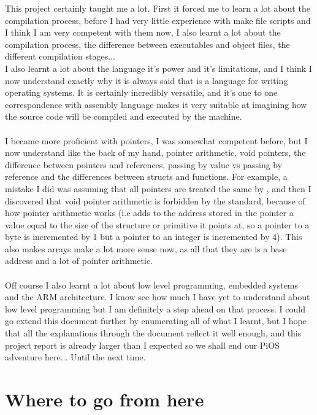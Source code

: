 \documentclass[12pt, svgnames]{book}
\begin{document}
This project certainly taught me a lot. First it forced me to learn a lot about the compilation process, before I had very little experience with make file scripts and I think I am very competent with them now, I also learnt a lot about the compilation process, the difference between executables and object files, the different compilation stages...
\\
I also learnt a lot about the  language it's power and it's limitations, and I think I now understand exactly why it is always said that  is a language for writing operating systems. It is certainly incredibly versatile, and it's one to one correspondence with assembly language makes it very suitable at imagining how the source code will be compiled and executed by the machine. 
\\~\\
I became more proficient with pointers, I was somewhat competent before, but I now understand like the back of my hand, pointer arithmetic, void pointers, the difference between pointers and references, passing by value vs passing by reference and the differences between structs and functions. For example, a mistake I did was assuming that all pointers are treated the same by , and then I discovered that void pointer arithmetic is forbidden by the  standard, because of how pointer arithmetic works (i.e  adds to the address stored in the pointer a value equal to the size of the structure or primitive it points at, so a pointer to a byte is incremented by 1 but a pointer to an integer is incremented by 4). This also makes arrays make a lot more sense now, as all that they are is a base address and a lot of pointer arithmetic.
\\~\\
Off course I also learnt a lot about low level programming, embedded systems and the ARM architecture. I know see how much I have yet to understand about low level programming but I am definitely a step ahead on that process. I could go extend this document further by enumerating all of what I learnt, but I hope that all the explanations through the document reflect it well enough, and this project report is already larger than I expected so we shall end our PiOS adventure here... Until the next time.

\chapter*{Where to go from here}
\end{document}
